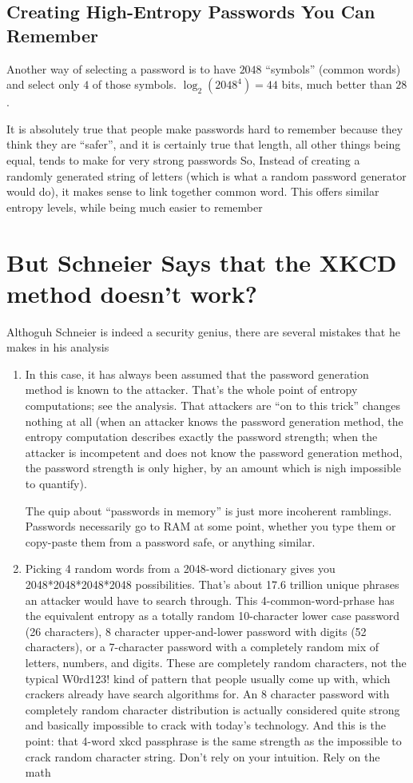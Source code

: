 \documentclass{scrartcl}
\begin{document}
\subsection{Creating High-Entropy Passwords You Can Remember}
\label{sec:org3490da3}
Another way of selecting a password is to have \(2048\) ``symbols'' (common words) and
select only \(4\) of those symbols. \(\log_{2}(2048^{4})=44\) bits, much better than \(28\).

It is absolutely true that people make passwords hard to remember because they
think they are ``safer'', and it is certainly true that length, all other things
being equal, tends to make for very strong passwords So, Instead of creating a
randomly generated string of letters (which is what a random password generator
would do), it makes sense to link together common word. This offers similar
entropy levels, while being much easier to remember

\section{But Schneier Says that the XKCD method doesn't work?}
\label{sec:org0c3e7d2}
Althoguh Schneier is indeed a security genius, there are several mistakes that
he makes in his analysis

\begin{enumerate}
\item In this case, it has always been assumed that the password generation method
is known to the attacker. That's the whole point of entropy computations; see
the analysis. That attackers are ``on to this trick'' changes nothing at all
(when an attacker knows the password generation method, the entropy
computation describes exactly the password strength; when the attacker is
incompetent and does not know the password generation method, the password
strength is only higher, by an amount which is nigh impossible to quantify).

The quip about ``passwords in memory'' is just more incoherent ramblings.
Passwords necessarily go to RAM at some point, whether you type them or
copy-paste them from a password safe, or anything similar.

\item Picking 4 random words from a 2048-word dictionary gives you
2048*2048*2048*2048 possibilities. That's about 17.6 trillion unique phrases
an attacker would have to search through. This
4-common-word-prhase has the equivalent entropy as a totally random
10-character lower case password (26 characters), 8 character upper-and-lower
password with digits (52 characters), or a 7-character password with a
completely random mix of letters, numbers, and digits. These are completely
random characters, not the typical W0rd123! kind of pattern that people
usually come up with, which crackers already have search algorithms for. An 8
character password with completely random character distribution is actually
considered quite strong and basically impossible to crack with today's
technology. And this is the point: that 4-word xkcd passphrase is the same
strength as the impossible to crack random character string. Don't rely on
your intuition. Rely on the math
\end{enumerate}
\end{document}
